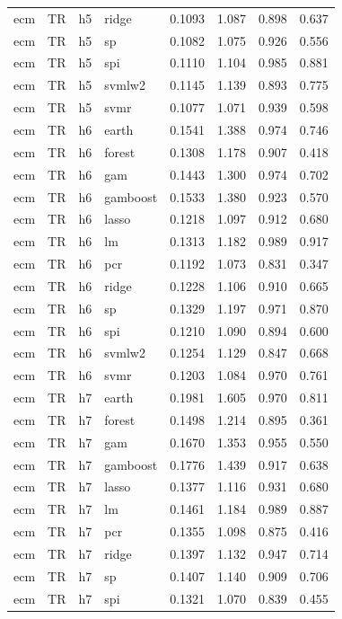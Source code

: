 \begin{ThreePartTable}
\begin{longtable}[t]{llclcccc}
ecm & TR & h5 & ridge & 0.1093 & 1.087 & 0.898 & 0.637\\
ecm & TR & h5 & sp & 0.1082 & 1.075 & 0.926 & 0.556\\
ecm & TR & h5 & spi & 0.1110 & 1.104 & 0.985 & 0.881\\
ecm & TR & h5 & svmlw2 & 0.1145 & 1.139 & 0.893 & 0.775\\
ecm & TR & h5 & svmr & 0.1077 & 1.071 & 0.939 & 0.598\\
\addlinespace
ecm & TR & h6 & earth & 0.1541 & 1.388 & 0.974 & 0.746\\
ecm & TR & h6 & forest & 0.1308 & 1.178 & 0.907 & 0.418\\
ecm & TR & h6 & gam & 0.1443 & 1.300 & 0.974 & 0.702\\
ecm & TR & h6 & gamboost & 0.1533 & 1.380 & 0.923 & 0.570\\
ecm & TR & h6 & lasso & 0.1218 & 1.097 & 0.912 & 0.680\\
ecm & TR & h6 & lm & 0.1313 & 1.182 & 0.989 & 0.917\\
ecm & TR & h6 & pcr & 0.1192 & 1.073 & 0.831 & 0.347\\
ecm & TR & h6 & ridge & 0.1228 & 1.106 & 0.910 & 0.665\\
ecm & TR & h6 & sp & 0.1329 & 1.197 & 0.971 & 0.870\\
ecm & TR & h6 & spi & 0.1210 & 1.090 & 0.894 & 0.600\\
ecm & TR & h6 & svmlw2 & 0.1254 & 1.129 & 0.847 & 0.668\\
ecm & TR & h6 & svmr & 0.1203 & 1.084 & 0.970 & 0.761\\
\addlinespace
ecm & TR & h7 & earth & 0.1981 & 1.605 & 0.970 & 0.811\\
ecm & TR & h7 & forest & 0.1498 & 1.214 & 0.895 & 0.361\\
ecm & TR & h7 & gam & 0.1670 & 1.353 & 0.955 & 0.550\\
ecm & TR & h7 & gamboost & 0.1776 & 1.439 & 0.917 & 0.638\\
ecm & TR & h7 & lasso & 0.1377 & 1.116 & 0.931 & 0.680\\
ecm & TR & h7 & lm & 0.1461 & 1.184 & 0.989 & 0.887\\
ecm & TR & h7 & pcr & 0.1355 & 1.098 & 0.875 & 0.416\\
ecm & TR & h7 & ridge & 0.1397 & 1.132 & 0.947 & 0.714\\
ecm & TR & h7 & sp & 0.1407 & 1.140 & 0.909 & 0.706\\
ecm & TR & h7 & spi & 0.1321 & 1.070 & 0.839 & 0.455\\

\end{longtable}
\end{ThreePartTable}
